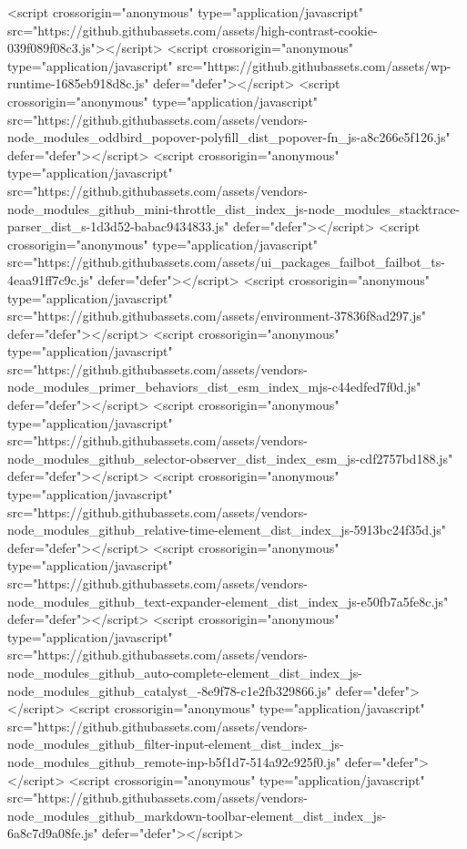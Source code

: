 <script crossorigin="anonymous" type="application/javascript" src="https://github.githubassets.com/assets/high-contrast-cookie-039f089f08c3.js"></script>
<script crossorigin="anonymous" type="application/javascript" src="https://github.githubassets.com/assets/wp-runtime-1685eb918d8c.js" defer="defer"></script>
<script crossorigin="anonymous" type="application/javascript" src="https://github.githubassets.com/assets/vendors-node_modules_oddbird_popover-polyfill_dist_popover-fn_js-a8c266e5f126.js" defer="defer"></script>
<script crossorigin="anonymous" type="application/javascript" src="https://github.githubassets.com/assets/vendors-node_modules_github_mini-throttle_dist_index_js-node_modules_stacktrace-parser_dist_s-1d3d52-babac9434833.js" defer="defer"></script>
<script crossorigin="anonymous" type="application/javascript" src="https://github.githubassets.com/assets/ui_packages_failbot_failbot_ts-4eaa91ff7c9c.js" defer="defer"></script>
<script crossorigin="anonymous" type="application/javascript" src="https://github.githubassets.com/assets/environment-37836f8ad297.js" defer="defer"></script>
<script crossorigin="anonymous" type="application/javascript" src="https://github.githubassets.com/assets/vendors-node_modules_primer_behaviors_dist_esm_index_mjs-c44edfed7f0d.js" defer="defer"></script>
<script crossorigin="anonymous" type="application/javascript" src="https://github.githubassets.com/assets/vendors-node_modules_github_selector-observer_dist_index_esm_js-cdf2757bd188.js" defer="defer"></script>
<script crossorigin="anonymous" type="application/javascript" src="https://github.githubassets.com/assets/vendors-node_modules_github_relative-time-element_dist_index_js-5913bc24f35d.js" defer="defer"></script>
<script crossorigin="anonymous" type="application/javascript" src="https://github.githubassets.com/assets/vendors-node_modules_github_text-expander-element_dist_index_js-e50fb7a5fe8c.js" defer="defer"></script>
<script crossorigin="anonymous" type="application/javascript" src="https://github.githubassets.com/assets/vendors-node_modules_github_auto-complete-element_dist_index_js-node_modules_github_catalyst_-8e9f78-c1e2fb329866.js" defer="defer"></script>
<script crossorigin="anonymous" type="application/javascript" src="https://github.githubassets.com/assets/vendors-node_modules_github_filter-input-element_dist_index_js-node_modules_github_remote-inp-b5f1d7-514a92c925f0.js" defer="defer"></script>
<script crossorigin="anonymous" type="application/javascript" src="https://github.githubassets.com/assets/vendors-node_modules_github_markdown-toolbar-element_dist_index_js-6a8c7d9a08fe.js" defer="defer"></script>
